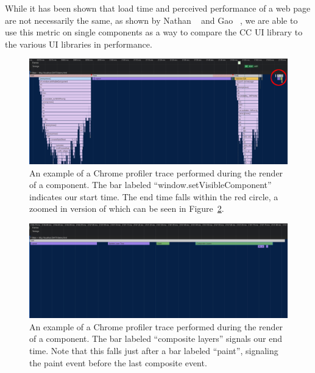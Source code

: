 While it has been shown that load time and perceived performance of a web page are not necessarily the same, as shown by Nathan \etal{}~\cite{nathan2018measuring} and Gao \etal{}~\cite{gao2017perceived}, we are able to use this metric on single components as a way to compare the CC UI library to the various UI libraries in performance.

\begin{figure}[h]
	\includegraphics[width=\columnwidth]{figures/experimental-setup/render-time-highlighted.png}
	\caption{An example of a Chrome profiler trace performed during the render of a component. The bar labeled ``window.setVisibleComponent'' indicates our start time. The end time falls within the red circle, a zoomed in version of which can be seen in Figure~\ref{fig:experimental-setup:render-time-end}.}
	\label{fig:experimental-setup:render-time-start}
	\centering
\end{figure}

\begin{figure}[h]
	\includegraphics[width=\columnwidth]{figures/experimental-setup/render-time-zoomed.png}
	\caption{An example of a Chrome profiler trace performed during the render of a component. The bar labeled ``composite layers'' signals our end time. Note that this falls just after a bar labeled ``paint'', signaling the paint event before the last composite event.}
	\label{fig:experimental-setup:render-time-end}
	\centering
\end{figure}

